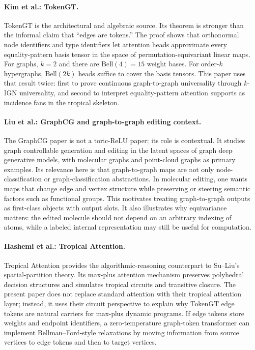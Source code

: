 \documentclass[11pt]{article}
\newcommand{\bell}{\mathrm{Bell}}
\begin{document}
\paragraph{Kim et al.: TokenGT.}
TokenGT \cite{kim2022tokengt} is the architectural and algebraic source.  Its theorem is stronger than the informal claim that ``edges are tokens.''  The proof shows that orthonormal node identifiers and type identifiers let attention heads approximate every equality-pattern basis tensor in the space of permutation-equivariant linear maps.  For graphs, $k=2$ and there are $\bell(4)=15$ weight bases.  For order-$k$ hypergraphs, $\bell(2k)$ heads suffice to cover the basis tensors.  This paper uses that result twice: first to prove continuous graph-to-graph universality through $k$-IGN universality, and second to interpret equality-pattern attention supports as incidence fans in the tropical skeleton.

\paragraph{Liu et al.: GraphCG and graph-to-graph editing context.}
The GraphCG paper \cite{liu2024graphcg} is not a toric-ReLU paper; its role is contextual.  It studies graph controllable generation and editing in the latent spaces of graph deep generative models, with molecular graphs and point-cloud graphs as primary examples.  Its relevance here is that graph-to-graph maps are not only node-classification or graph-classification abstractions.  In molecular editing, one wants maps that change edge and vertex structure while preserving or steering semantic factors such as functional groups.  This motivates treating graph-to-graph outputs as first-class objects with output slots.  It also illustrates why equivariance matters: the edited molecule should not depend on an arbitrary indexing of atoms, while a labeled internal representation may still be useful for computation.

\paragraph{Hashemi et al.: Tropical Attention.}
Tropical Attention \cite{hashemi2025tropicalattention} provides the algorithmic-reasoning counterpart to Su--Liu's spatial-partition theory.  Its max-plus attention mechanism preserves polyhedral decision structures and simulates tropical circuits and transitive closure.  The present paper does not replace standard attention with their tropical attention layer; instead, it uses their circuit perspective to explain why TokenGT edge tokens are natural carriers for max-plus dynamic programs.  If edge tokens store weights and endpoint identifiers, a zero-temperature graph-token transformer can implement Bellman--Ford-style relaxations by moving information from source vertices to edge tokens and then to target vertices.
\end{document}
